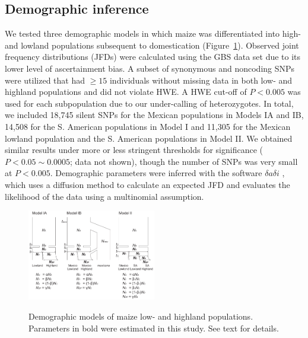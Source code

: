 \subsection*{Demographic inference}
We tested three demographic models in which maize was differentiated into high- and lowland populations subsequent to domestication (Figure~\ref{model}). 
Observed joint frequency distributions (JFDs) were calculated using the GBS data set due to its lower level of ascertainment bias. 
A subset of synonymous and noncoding SNPs were utilized that had $\geq15$ individuals without missing data in both low- and highland populations and did not violate HWE.  
A HWE cut-off of $P<0.005$ was used for each subpopulation due to our under-calling of heterozygotes. 
In total, we included 18,745 silent SNPs for the Mexican populations in Models IA and IB, 14,508 for the S. American populations in Model I and 11,305 for the Mexican lowland population and the S. American populations in Model II.  
We obtained similar results under more or less stringent thresholds for significance ($P < 0.05\sim0.0005$; data not shown), though the number of SNPs was very small at $P<0.005$.  
Demographic parameters were inferred with the software $\delta a \delta i$ \cite[]{Gutenkunst_2009_19851460}, which uses a diffusion method to calculate an expected JFD and evaluates the likelihood of the data using a multinomial assumption.

\begin{figure}[tb]   
  \begin{center}
   \vspace{-0mm}
   \includegraphics[width=0.5\textwidth]{fig/Fig3}
   \renewcommand{\baselinestretch}{0.9}
   \vspace{-3mm}
   \caption{ Demographic models of maize low- and highland populations.  Parameters in bold were estimated in this study.  See text for details.
   }
\vspace{-6mm}
    \label{model}
  \end{center}
\end{figure}

